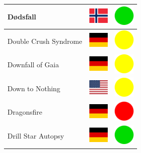 \documentclass[12pt, a4paper, twoside]{report}
\begin{document}
\begin{center}
\begin{longtable}{|p{5cm}|p{2cm}|p{2cm}|}
 Dødsfall                                                   & \includegraphics[width=1cm]{../4x3/no} &   \includegraphics[width=1cm]{../likes/y} \\ \hline
 Double Crush Syndrome                                      & \includegraphics[width=1cm]{../4x3/de} &   \includegraphics[width=1cm]{../likes/m} \\ \hline
 Downfall of Gaia                                           & \includegraphics[width=1cm]{../4x3/de} &   \includegraphics[width=1cm]{../likes/m} \\ \hline
 Down to Nothing                                            & \includegraphics[width=1cm]{../4x3/us} &   \includegraphics[width=1cm]{../likes/m} \\ \hline
 Dragonsfire                                                & \includegraphics[width=1cm]{../4x3/de} &   \includegraphics[width=1cm]{../likes/n} \\ \hline
 Drill Star Autopsy                                         & \includegraphics[width=1cm]{../4x3/de} &   \includegraphics[width=1cm]{../likes/y} \\ \hline

\end{longtable}
\end{center}
\end{document}
